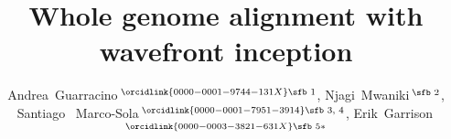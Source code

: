 \documentclass{bioinfo}
\theoremstyle{definition}
\begin{document}

\subtitle{ } %

\title[Wavefront inception]{Whole genome alignment with wavefront inception}
\author[Guarracino \textit{et~al}.]{
Andrea~Guarracino\,$^{\orcidlink{0000-0001-9744-131X}\text{\sfb 1}}$,
Njagi~Mwaniki\,$^{\text{\sfb 2}}$,
Santiago~ Marco-Sola\,$^{\orcidlink{0000-0001-7951-3914}\text{\sfb 3, 4}}$,
Erik~Garrison\,$^{\orcidlink{0000-0003-3821-631X}\text{\sfb 5}*}$
}

\address{
$^{\text{\sf 1}}$Genomics Research Centre, Human Technopole, Viale Rita Levi‑Montalcini 1, Milan, 20157, Italy \\
$^{\text{\sf 2}}$Department of Computer Sciences, University of Pisa, Pisa, 56127, Italy \\
$^{\text{\sf 3}}$Department of Computer Sciences, Barcelona Supercomputing Center, Barcelona, 08034, Spain \\
$^{\text{\sf 4}}$Department d’Arquitectura de Computadors i Sistemes Operatius, Universitat Autònoma de Barcelona, Barcelona, 08193, Spain \\
$^{\text{\sf 5}}$Department of Genetics, Genomics and Informatics, University of Tennessee Health Science Center, Memphis, 38163, Tennessee, USA
}



\history{ } %

\editor{ } %
\end{document}
